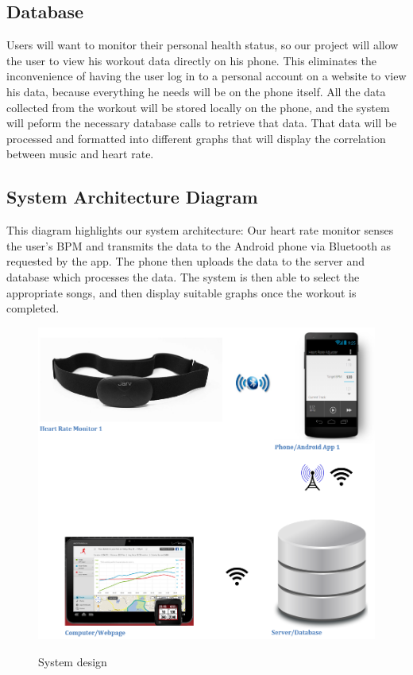 \documentclass[letterpaper,english, 12pt]{scrreprt}
\begin{document}
\subsection{Database}
Users will want to monitor their personal health status, so our project will allow the user to view his workout data directly on his phone. This eliminates the inconvenience of having the user log in to a personal account on a website to view his data, because everything he needs will be on the phone itself. All the data collected from the workout will be stored locally on the phone, and the system will peform the necessary database calls to retrieve that data. That data will be processed and formatted into different graphs that will display the correlation between music and heart rate.


\subsection{System Architecture Diagram}
This diagram highlights our system architecture: Our heart rate monitor senses the
user's BPM and transmits the data to the Android phone via Bluetooth as requested
by the app. The phone then uploads the data to the server and database
which processes the data. The system is then able to select the appropriate
songs, and then display suitable graphs once the workout is completed.

\begin{figure}[H]
	\centering
	\includegraphics{img/system_architecture.png}\\
	\caption{System design}
\end{figure}
\end{document}
